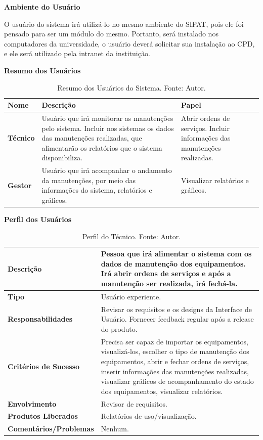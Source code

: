 \textbf{Ambiente do Usuário}

O usuário do sistema irá utilizá-lo no mesmo ambiente do SIPAT, pois ele foi pensado para ser um módulo do mesmo. Portanto, será instalado nos computadores da universidade, o usuário deverá solicitar sua instalação ao CPD, e ele será utilizado pela intranet da instituição.

\pagebreak

\textbf{Resumo dos Usuários}

\begin{table}[H]
\centering
\caption{Resumo dos Usuários do Sistema. Fonte: Autor.}
\label{tab-resumo-usuarios}
\begin{tabular}{ | p{2cm} | p{7cm} | p{5cm} | }
\hline
	\textbf{Nome} & \textbf{Descrição} & \textbf{Papel} \\ \hline
	\textbf{Técnico} & Usuário que irá monitorar as manutenções pelo sistema. Incluir nos sistemas os dados das manutenções realizadas, que alimentarão os relatórios que o sistema disponibiliza. & Abrir ordens de serviços. Incluir informações das manutenções realizadas. \\ \hline
	\textbf{Gestor} & Usuário que irá acompanhar o andamento da manutenções, por meio das informações do sistema, relatórios e gráficos. & Visualizar relatórios e gráficos. \\ \hline
\end{tabular}
\end{table}



\textbf{Perfil dos Usuários}

\begin{table}[H]
\centering
\caption{Perfil do Técnico. Fonte: Autor.}
\label{tab-perfil-tec}
\begin{tabular}{ | p{5cm} | p{10cm} | }
\hline
	\textbf{Descrição} & Pessoa que irá alimentar o sistema com os dados de manutenção dos equipamentos. Irá abrir ordens de serviços e após a manutenção ser realizada, irá fechá-la.  \\ \hline
	\textbf{Tipo} & Usuário experiente. \\ \hline
	\textbf{Responsabilidades} &  Revisar os requisitos e os designs da Interface de Usuário. Fornecer feedback regular após a release do produto. \\ \hline
	\textbf{Critérios de Sucesso} & Precisa ser capaz de importar os equipamentos, visualizá-los, escolher o tipo de manutenção dos equipamentos, abrir e fechar ordens de serviços, inserir informações das manutenções realizadas, visualizar gráficos de acompanhamento do estado dos equipamentos, visualizar relatórios. \\ \hline
	\textbf{Envolvimento} & Revisor de requisitos. \\ \hline
	\textbf{Produtos Liberados} & Relatórios de uso/visualização. \\ \hline
	\textbf{Comentários/Problemas} & Nenhum. \\ \hline
\end{tabular}
\end{table}

